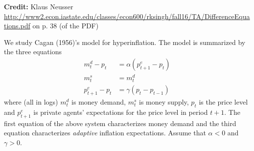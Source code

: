 \documentclass[11pt]{extarticle}
\theoremstyle{plain}
\theoremstyle{definition}
\begin{document}
\textbf{Credit:} Klaus Neusser \url{http://www2.econ.iastate.edu/classes/econ600/rksingh/fall16/TA/DifferenceEquations.pdf} on p. 38 (of the PDF)

\vspace{5mm}
\noindent
We study Cagan (1956)'s model for hyperinflation. The model is summarized by the three equations
\begin{align*}
	m_t^d - p_t &= \alpha (p_{t+1}^e - p_t) \\
	m_t^s &= m_t^d \\
	p_{t+1}^e - p_t &= \gamma(p_t - p_{t-1})
\end{align*}
where (all in logs) $m_t^d$ is money demand, $m_t^s$ is money supply, $p_t$ is the price level and $p_{t+1}^e$ is private agents' expectations for the price level in period $t+1$. The first equation of the above system characterizes money demand and the third equation characterizes \textit{adaptive} inflation expectations. Assume that $\alpha < 0$ and $\gamma > 0$.
\end{document}

